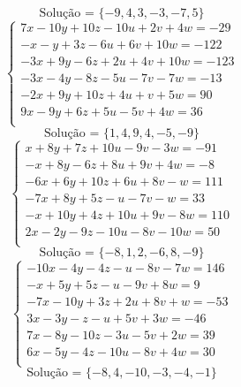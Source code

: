 \documentclass[12pt,oneside,a4paper]{article}
\begin{document}
\begin{equation*}
\text{Solução = }\{-9,4,3,-3,-7,5\}
\end{equation*}
\vspace{\baselineskip}
\begin{equation*}
\begin{cases}
7x-10y+10z-10u+2v+4w=-29 \\
-x-y+3z-6u+6v+10w=-122 \\
-3x+9y-6z+2u+4v+10w=-123 \\
-3x-4y-8z-5u-7v-7w=-13 \\
-2x+9y+10z+4u+v+5w=90 \\
9x-9y+6z+5u-5v+4w=36 \\
\end{cases}
\end{equation*}
\begin{equation*}
\text{Solução = }\{1,4,9,4,-5,-9\}
\end{equation*}
\vspace{\baselineskip}
\begin{equation*}
\begin{cases}
x+8y+7z+10u-9v-3w=-91 \\
-x+8y-6z+8u+9v+4w=-8 \\
-6x+6y+10z+6u+8v-w=111 \\
-7x+8y+5z-u-7v-w=33 \\
-x+10y+4z+10u+9v-8w=110 \\
2x-2y-9z-10u-8v-10w=50 \\
\end{cases}
\end{equation*}
\begin{equation*}
\text{Solução = }\{-8,1,2,-6,8,-9\}
\end{equation*}
\vspace{\baselineskip}
\begin{equation*}
\begin{cases}
-10x-4y-4z-u-8v-7w=146 \\
-x+5y+5z-u-9v+8w=9 \\
-7x-10y+3z+2u+8v+w=-53 \\
3x-3y-z-u+5v+3w=-46 \\
7x-8y-10z-3u-5v+2w=39 \\
6x-5y-4z-10u-8v+4w=30 \\
\end{cases}
\end{equation*}
\begin{equation*}
\text{Solução = }\{-8,4,-10,-3,-4,-1\}
\end{equation*}
\end{document}
